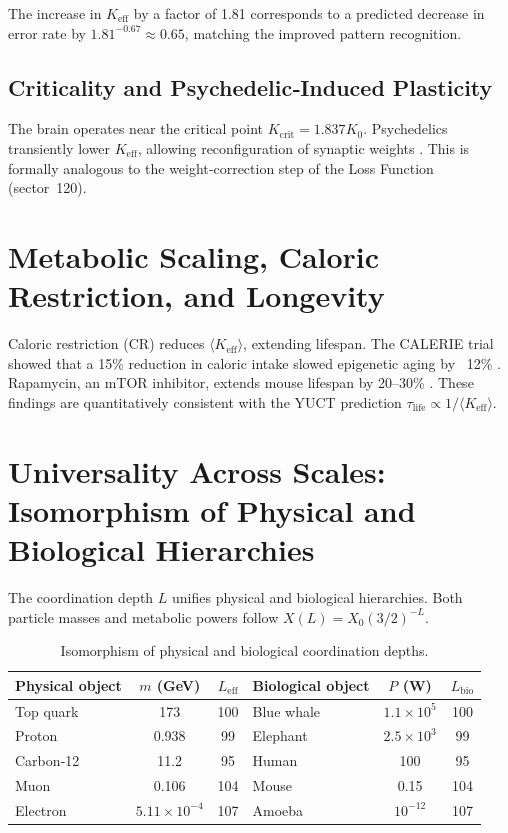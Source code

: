 \documentclass[11pt,a4paper]{article}
\begin{document}
	The increase in \(K_{\text{eff}}\) by a factor of 1.81 corresponds to a predicted decrease in error rate by \(1.81^{-0.67} \approx 0.65\), matching the improved pattern recognition.
	
	\subsection{Criticality and Psychedelic‑Induced Plasticity}
	
	The brain operates near the critical point \(K_{\mathrm{crit}} = 1.837 K_0\). Psychedelics transiently lower \(K_{\text{eff}}\), allowing reconfiguration of synaptic weights \cite{CarhartHarris2018, CarhartHarris2023}. This is formally analogous to the weight‑correction step of the Loss Function (sector~120).
	
	\section{Metabolic Scaling, Caloric Restriction, and Longevity}
	\label{sec:metabolism}
	
	Caloric restriction (CR) reduces \(\langle K_{\text{eff}} \rangle\), extending lifespan. The CALERIE trial showed that a 15\% reduction in caloric intake slowed epigenetic aging by ~12\% \cite{CALERIE2018}. Rapamycin, an mTOR inhibitor, extends mouse lifespan by 20–30\% \cite{Miller2022}. These findings are quantitatively consistent with the YUCT prediction \(\tau_{\text{life}} \propto 1/\langle K_{\text{eff}} \rangle\).
	
	\section{Universality Across Scales: Isomorphism of Physical and Biological Hierarchies}
	\label{sec:isomorphism}
	
	The coordination depth \(L\) unifies physical and biological hierarchies. Both particle masses and metabolic powers follow \(X(L) = X_0 (3/2)^{-L}\).
	
	\begin{table}[H]
		\centering
		\caption{Isomorphism of physical and biological coordination depths.}
		\label{tab:isomorphism}
		\begin{tabular}{l c c l c c}
			\toprule
			\textbf{Physical object} & \(m\) (GeV) & \(L_{\mathrm{eff}}\) & \textbf{Biological object} & \(P\) (W) & \(L_{\mathrm{bio}}\) \\
			\midrule
			Top quark & 173 & 100 & Blue whale & \(1.1\times10^5\) & 100 \\
			Proton & 0.938 & 99 & Elephant & \(2.5\times10^3\) & 99 \\
			Carbon‑12 & 11.2 & 95 & Human & 100 & 95 \\
			Muon & 0.106 & 104 & Mouse & 0.15 & 104 \\
			Electron & \(5.11\times10^{-4}\) & 107 & Amoeba & \(10^{-12}\) & 107 \\
			\bottomrule
		\end{tabular}
	\end{table}
	
\end{document}

